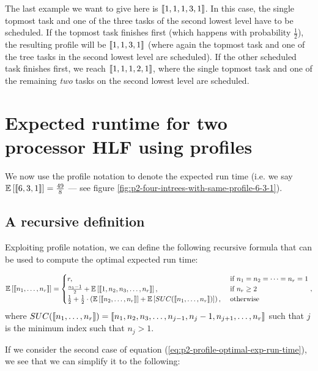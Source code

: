 The last example we want to give here is $\left\llbracket 1,1,1,3,1 \right\rrbracket$. In this case, the single topmost task and one of the three tasks of the second lowest level have to be scheduled. If the topmost task finishes first (which happens with probability $\frac{1}{2}$), the resulting profile will be $\left\llbracket 1,1,3,1 \right\rrbracket$ (where again the topmost task and one of the tree tasks in the second lowest level are scheduled). If the other scheduled task finishes first, we reach $\left\llbracket 1,1,1,2,1 \right\rrbracket$, where the single topmost task and one of the remaining \emph{two} tasks on the second lowest level are scheduled.

\section{Expected runtime for two processor HLF using profiles}
\label{sec:p2-profiles-hlf-exp-runtime}

We now use the profile notation to denote the expected run time (i.e. we say $\mathbb{E}\left[ \left\llbracket 6,3,1 \right\rrbracket \right] = \frac{49}{8}$ --- see figure \ref{fig:p2-four-intrees-with-same-profile-6-3-1}).

\subsection{A recursive definition}
\label{sec:p2-profile-exp-run-time-rec-def}

Exploiting profile notation, we can define the following recursive formula that can be used to compute the optimal expected run time:

\begin{equation}
  \label{eq:p2-profile-optimal-exp-run-time}
  \mathbb{E}\left[ \left\llbracket n_1, \dots, n_r \right\rrbracket \right] =
  \begin{cases}
    r, & \text{ if } n_1 = n_2 = \dots = n_r = 1 \\
    \frac{n_1-1}{2} + \mathbb{E}\left[ \left\llbracket 1, n_2, n_3, \dots, n_r \right\rrbracket \right] , & \text{ if } n_r\geq 2 \\
    \frac{1}{2} + \frac{1}{2} \cdot \left( \mathbb{E}\left[ \left\llbracket n_2, \dots, n_r \right\rrbracket \right] + \mathbb{E}\left[ SUC(\left\llbracket n_1,\dots,n_r \right\rrbracket) \right] \right) ,& \text{ otherwise }
  \end{cases},
\end{equation}
where $SUC(\left\llbracket n_1,\dots,n_r \right\rrbracket) = \left\llbracket n_1, n_2, n_3,\dots,n_{j-1},n_j-1,n_{j+1},\dots,n_r \right\rrbracket$ such that $j$ is the minimum index such that $n_j>1$.

If we consider the second case of equation (\ref{eq:p2-profile-optimal-exp-run-time}), we see that we can simplify it to the following:

